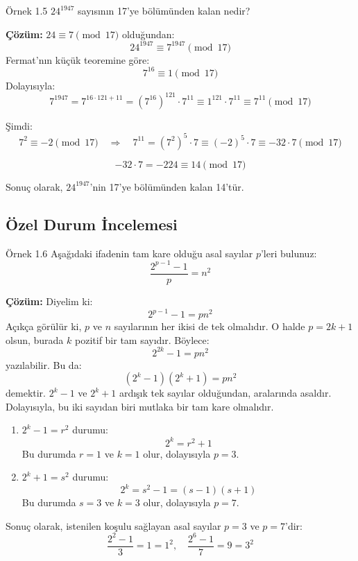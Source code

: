 \begin{examplebox}{Örnek 1.5}
$24^{1947}$ sayısının 17'ye bölümünden kalan nedir?

\textbf{Çözüm:}  
$24 \equiv 7 \pmod{17}$ olduğundan:
\[
24^{1947} \equiv 7^{1947} \pmod{17}
\]
Fermat'nın küçük teoremine göre:
\[
7^{16} \equiv 1 \pmod{17}
\]
Dolayısıyla:
\[
7^{1947} = 7^{16 \cdot 121 + 11} = (7^{16})^{121} \cdot 7^{11} \equiv 1^{121} \cdot 7^{11} \equiv 7^{11} \pmod{17}
\]

Şimdi:
\[
7^2 \equiv -2 \pmod{17}
\quad \Rightarrow \quad
7^{11} = (7^2)^5 \cdot 7 \equiv (-2)^5 \cdot 7 \equiv -32 \cdot 7 \pmod{17}
\]

\[
-32 \cdot 7 = -224 \equiv 14 \pmod{17}
\]

Sonuç olarak, $24^{1947}$'nin 17'ye bölümünden kalan 14'tür.
\end{examplebox}

\subsection*{Özel Durum İncelemesi}

\begin{examplebox}{Örnek 1.6}
Aşağıdaki ifadenin tam kare olduğu asal sayılar $p$'leri bulunuz:
\[
\frac{2^{p-1}-1}{p} = n^2
\]

\textbf{Çözüm:}  
Diyelim ki:
\[
2^{p-1} - 1 = p n^2
\]
Açıkça görülür ki, $p$ ve $n$ sayılarının her ikisi de tek olmalıdır. O halde $p = 2k + 1$ olsun, burada $k$ pozitif bir tam sayıdır. Böylece:
\[
2^{2k} - 1 = p n^2
\]
yazılabilir. Bu da:
\[
(2^k - 1)(2^k + 1) = p n^2
\]
demektir. $2^k - 1$ ve $2^k + 1$ ardışık tek sayılar olduğundan, aralarında asaldır. Dolayısıyla, bu iki sayıdan biri mutlaka bir tam kare olmalıdır.

\begin{enumerate}
    \item $2^k - 1 = r^2$ durumu:
    \[
    2^k = r^2 + 1
    \]
    Bu durumda $r = 1$ ve $k = 1$ olur, dolayısıyla $p = 3$.

    \item $2^k + 1 = s^2$ durumu:
    \[
    2^k = s^2 - 1 = (s - 1)(s + 1)
    \]
    Bu durumda $s = 3$ ve $k = 3$ olur, dolayısıyla $p = 7$.
\end{enumerate}

Sonuç olarak, istenilen koşulu sağlayan asal sayılar $p = 3$ ve $p = 7$'dir:
\[
\frac{2^{2}-1}{3} = 1 = 1^2, \quad \frac{2^{6}-1}{7} = 9 = 3^2
\]
\end{examplebox}

